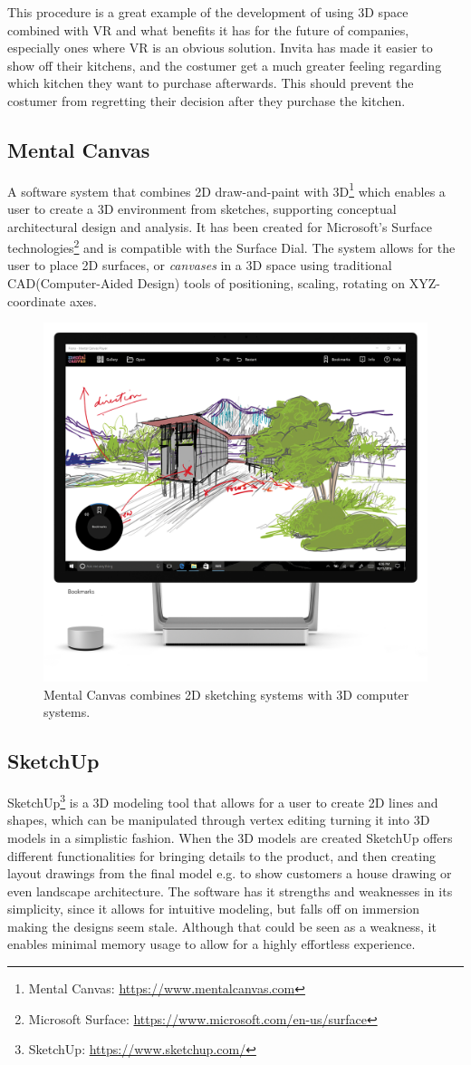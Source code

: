 			This procedure is a great example of the development of using 3D space combined with VR and what benefits it has for the future of companies, especially ones where VR is an obvious solution. Invita has made it easier to show off their kitchens, and the costumer get a much greater feeling regarding which kitchen they want to purchase afterwards. This should prevent the costumer from regretting their decision after they purchase the kitchen.

			
		\subsection{Mental Canvas}
			A software system that combines 2D draw-and-paint with 3D\footnote{Mental Canvas: \url{https://www.mentalcanvas.com}} which enables a user to create a 3D environment from sketches, supporting conceptual architectural design and analysis. It has been created for Microsoft's Surface technologies\footnote{Microsoft Surface: \url{https://www.microsoft.com/en-us/surface}} and is compatible with the Surface Dial. The system allows for the user to place 2D surfaces, or \textit{canvases} in a 3D space using traditional CAD(Computer-Aided Design) tools of positioning, scaling, rotating on XYZ-coordinate axes.\cite{sotaMentalCanvas}
			
			\begin{figure}[H]
				\centering
				\includegraphics[width=0.5\linewidth]{figure/Analysis/mentalCanvas.png}
				\caption{Mental Canvas combines 2D sketching systems with 3D computer systems.}
				\label{fig:mentalCanvas}
			\end{figure}

		\subsection{SketchUp}
			SketchUp\footnote{SketchUp: \url{https://www.sketchup.com/}} is a 3D modeling tool that allows for a user to create 2D lines and shapes, which can be manipulated through vertex editing turning it into 3D models in a simplistic fashion. When the 3D models are created SketchUp offers different functionalities for bringing details to the product, and then creating layout drawings from the final	model e.g. to show customers a house drawing or even landscape architecture. The software has it strengths and weaknesses in its simplicity, since it allows for intuitive modeling, but falls off on immersion making the designs seem stale. Although that could be seen as a weakness, it enables minimal memory usage to allow for a highly effortless experience. \\
			
